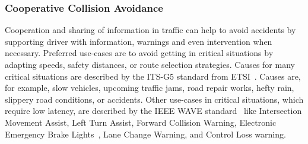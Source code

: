 \subsubsection{Cooperative Collision Avoidance}
Cooperation and sharing of information in traffic can help to avoid accidents by supporting driver with information, warnings and even intervention when necessary. Preferred use-cases are to avoid getting in critical situations by adapting speeds, safety distances, or route selection strategies. Causes for many critical situations are described by the ITS-G5 standard from ETSI~\cite{EN3026373}. Causes are, for example, slow vehicles, upcoming traffic jams, road repair works, hefty rain, slippery road conditions, or accidents. Other use-cases in critical situations, which require low latency, are described by the IEEE WAVE standard~\cite{4939288} like Intersection Movement Assist, Left Turn Assist, Forward Collision Warning, Electronic Emergency Brake Lights~\cite{Vinel2018}, Lane Change Warning, and Control Loss warning. 


